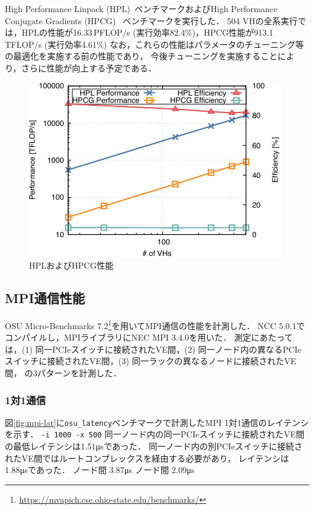 ﻿\documentclass[submit,techrep,noauthor]{ipsj}
\newcommand{\us}{\si{\micro\second}}
\begin{document}
High Performance Linpack (HPL)~\cite{Dongarra2003}ベンチマークおよびHigh Performance Conjugate
Gradients (HPCG)~\cite{Dongarra2016} ベンチマークを実行した．
504 VHの全系実行では，HPLの性能が16.33\,PFLOP/s (実行効率82.4\%)，HPCG性能が913.1\,TFLOP/s 
(実行効率4.61\%) なお，これらの性能はパラメータのチューニング等の最適化を実施する前の性能であり，
今後チューニングを実施することにより，さらに性能が向上する予定である．

\begin{figure}
  \centering
  \includegraphics{figs/hpl_hpcg.pdf}
  \caption{HPLおよびHPCG性能}\label{fig:hpl-hpcg}
\end{figure}

\subsection{MPI通信性能}

OSU Micro-Benchmarks
7.2\footnote{\url{https://mvapich.cse.ohio-state.edu/benchmarks/}}を用いてMPI通信の性能を計測した．
NCC 5.0.1でコンパイルし，MPIライブラリにNEC MPI 3.4.0を用いた．
測定にあたっては，(1) 同一PCIeスイッチに接続されたVE間，(2)
同一ノード内の異なるPCIeスイッチに接続されたVE間，(3) 同一ラックの異なるノードに接続されたVE間，
の3パターンを計測した．

\subsubsection{1対1通信}

図\ref{fig:mpi-lat}に\verb|osu_latency|ベンチマークで計測したMPI 1対1通信のレイテンシを示す．
\verb|-i 1000 -x 500|
同一ノード内の同一PCIeスイッチに接続されたVE間の最低レイテンシは1.51\us であった．
同一ノード内の別PCIeスイッチに接続されたVE間ではルートコンプレックスを経由する必要があり，
レイテンシは1.88\us であった．
ノード間 3.87\us
ノード間 2.09\us
\end{document}

